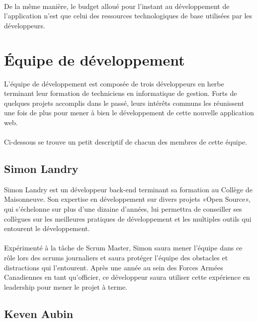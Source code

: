 \documentclass{scrreprt}
\begin{document}
\paragraph{}
De la même manière, le budget alloué pour l'instant au développement de l'application n'est que celui des ressources technologiques de base utilisées
par les développeurs.

\section{Équipe de développement}

L'équipe de développement est composée de trois développeurs en herbe terminant leur formation de techniciens en informatique de gestion.
Forts de quelques projets accomplis dans le passé, leurs intérêts communs les réunissent une fois de plus pour
mener à bien le développement de cette nouvelle application web.

\paragraph{}
Ci-dessous se trouve un petit descriptif de chacun des membres de cette équipe.

\subsection{Simon Landry}

Simon Landry est un développeur back-end terminant sa formation au Collège de
Maisonneuve. Son expertise en développement sur divers projets «Open Source»,
qui s'échelonne sur plus d'une dizaine d'années, lui permettra de conseiller
ses collègues sur les meilleures pratiques de développement et les multiples
outils qui entourent le développement.

\paragraph{}
Expérimenté à la tâche de Scrum Master, Simon saura mener l'équipe dans
ce rôle lors des scrums journaliers et saura protéger l'équipe des
obstacles et distractions qui l'entourent. Après une année au sein des
Forces Armées Canadiennes en tant qu'officier, ce développeur saura utiliser cette
expérience en leadership pour mener le projet à terme.

\newpage

\subsection{Keven Aubin}
\end{document}
